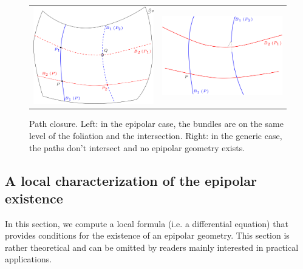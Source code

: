 \documentclass{ipol}
\begin{document}
\begin{figure}[h!]
\centering
\begin{tabular}{cc}
\includegraphics[width=7cm]{FIGS/ClothPathEpip.png} &
\includegraphics[width=7cm]{FIGS/ClothPathNonEpip.png}\\
\end{tabular}
\caption{Path closure. Left: in the epipolar case, the bundles are on the same level of the foliation and the intersection.
Right: in the generic case, the paths don't intersect and no epipolar geometry exists.}
\label{FigClothPath}
\end{figure}



\subsection{A local characterization of the epipolar existence}

In this section, we compute a local formula (i.e. a differential equation) that provides conditions for
the existence of an epipolar geometry. This section is rather theoretical and
can be omitted by readers mainly interested in practical applications.
\end{document}
